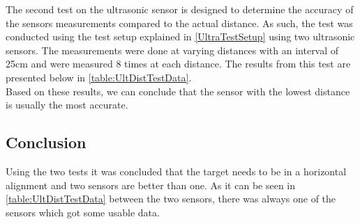 The second test on the ultrasonic sensor is designed to determine the accuracy
of the sensors measurements compared to the actual distance. As such, the test
was conducted using the test setup explained in \autoref{UltraTestSetup} using
two ultrasonic sensors. The measurements were done at varying distances with an
interval of 25cm and were measured 8 times at each distance. The results from
this test are presented below in \autoref{table:UltDistTestData}. \\
Based on these results, we can conclude that the sensor with the lowest
distance is usually the most accurate.

\subsection{Conclusion}
Using the two tests it was concluded that the target needs to be in a horizontal
alignment and two sensors are better than one. As it can be seen in
\autoref{table:UltDistTestData} between the two sensors, there was always one
of the sensors which got some usable data. 

% 




